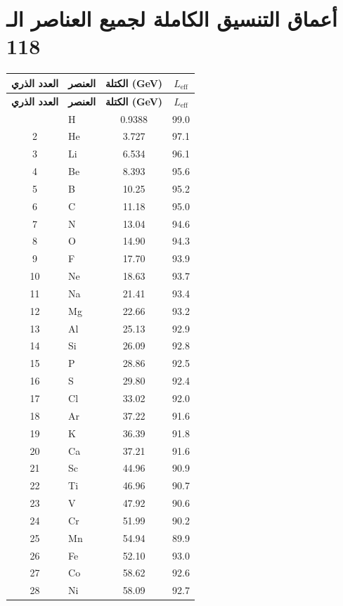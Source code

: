 \documentclass[12pt,a4paper]{article}
\begin{document}
	\section*{أعماق التنسيق الكاملة لجميع العناصر الـ 118}
	\label{sec:full_Leff}
	\begin{longtable}{c l c c}
		\toprule
		\textbf{العدد الذري} & \textbf{العنصر} & \textbf{الكتلة (GeV)} & \textbf{\(L_{\mathrm{eff}}\)} \\
		\midrule
		\endfirsthead
		\toprule
		\textbf{العدد الذري} & \textbf{العنصر} & \textbf{الكتلة (GeV)} & \textbf{\(L_{\mathrm{eff}}\)} \\
		\midrule
		\endhead
		\bottomrule
		\endfoot
		1  & H   & 0.9388 & 99.0 \\
		2  & He  & 3.727  & 97.1 \\
		3  & Li  & 6.534  & 96.1 \\
		4  & Be  & 8.393  & 95.6 \\
		5  & B   & 10.25  & 95.2 \\
		6  & C   & 11.18  & 95.0 \\
		7  & N   & 13.04  & 94.6 \\
		8  & O   & 14.90  & 94.3 \\
		9  & F   & 17.70  & 93.9 \\
		10 & Ne  & 18.63  & 93.7 \\
		11 & Na  & 21.41  & 93.4 \\
		12 & Mg  & 22.66  & 93.2 \\
		13 & Al  & 25.13  & 92.9 \\
		14 & Si  & 26.09  & 92.8 \\
		15 & P   & 28.86  & 92.5 \\
		16 & S   & 29.80  & 92.4 \\
		17 & Cl  & 33.02  & 92.0 \\
		18 & Ar  & 37.22  & 91.6 \\
		19 & K   & 36.39  & 91.8 \\
		20 & Ca  & 37.21  & 91.6 \\
		21 & Sc  & 44.96  & 90.9 \\
		22 & Ti  & 46.96  & 90.7 \\
		23 & V   & 47.92  & 90.6 \\
		24 & Cr  & 51.99  & 90.2 \\
		25 & Mn  & 54.94  & 89.9 \\
		26 & Fe  & 52.10  & 93.0 \\
		27 & Co  & 58.62  & 92.6 \\
		28 & Ni  & 58.09  & 92.7 \\

\end{longtable}
\end{document}
